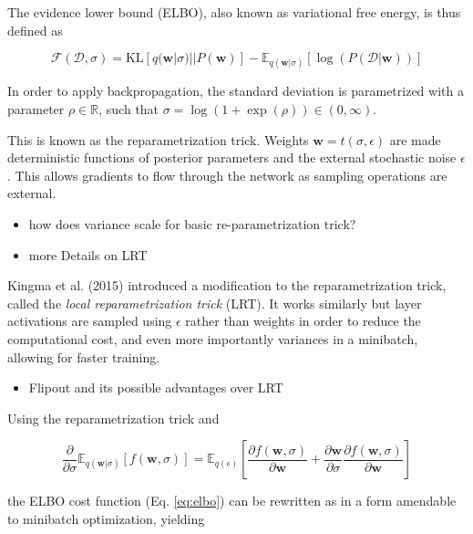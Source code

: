	The evidence lower bound (ELBO), also known as variational free energy, is thus defined as 
	
	\begin{equation}
	\label{eq:elbo}
		\mathcal{F}(\mathcal{D}, \sigma) = 
		\text{KL}[q(\pmb{w}|\sigma) || P(\pmb{w})] - \mathbb{E}_{q(\pmb{w}|\sigma)}[\log(P(\mathcal{D}|\pmb{w}))]
	\end{equation}

	In order to apply backpropagation, the standard deviation is parametrized with a parameter $\rho \in \mathbb{R}$, such that $\sigma = \log(1 + \exp(\rho)) \in (0,\infty)$. 
	
	This is known as the reparametrization trick. Weights $\pmb{w} = t(\sigma, \epsilon)$ are made deterministic functions of posterior parameters and the external stochastic noise $\epsilon$. This allows gradients to flow through the network as sampling operations are external. 
	
	\begin{itemize}
		\item how does variance scale for basic re-parametrization trick?
		\item more Details on LRT
	\end{itemize}

	Kingma et al. (2015) \cite{kingma_variational_2015} introduced a modification to the reparametrization trick, called the \textit{local reparametrization trick} (LRT). It works similarly but layer activations are sampled using $\epsilon$ rather than weights in order to reduce the computational cost, and even more importantly variances in a minibatch, allowing for faster training. 
	
	\begin{itemize}
		\item Flipout and its possible advantages over LRT
	\end{itemize}
	
	Using the reparametrization trick and 
	
	\begin{equation}
	\frac{\partial}{\partial \sigma} \mathbb{E}_{q(\pmb{w}|\sigma)}[f(\pmb{w}, \sigma)] =
	\mathbb{E}_{q(\epsilon)}[\frac{\partial f(\pmb{w}, \sigma)}{\partial \pmb{w}} + \frac{\partial \pmb{w}}{\partial \sigma}
	\frac{\partial f(\pmb{w}, \sigma)}{\partial \pmb{w}}]
	\end{equation}
	
	the ELBO cost function (Eq. \ref{eq:elbo}) can be rewritten as in a form amendable to minibatch optimization, yielding
	
